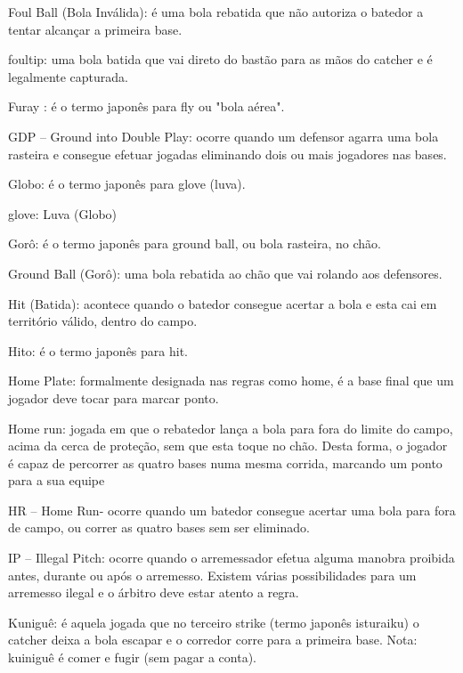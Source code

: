 Foul Ball (Bola Inválida): é uma bola rebatida que não autoriza o batedor a tentar alcançar a primeira base.

\gls{foultip}: uma bola batida que vai direto do bastão para as mãos do catcher e é legalmente capturada.

Furay : é o termo japonês para \gls{fly} ou "bola aérea".

GDP -- Ground into Double Play: ocorre quando um defensor agarra uma bola rasteira e consegue efetuar jogadas eliminando dois ou mais jogadores nas bases.

Globo: é o termo japonês para \gls{glove} (luva).

glove: Luva (Globo)

Gorô: é o termo japonês para \gls{ground} ball, ou bola rasteira, no chão.

Ground Ball (Gorô): uma bola rebatida ao chão que vai rolando aos defensores.



Hit (Batida): acontece quando o batedor consegue acertar a bola e esta cai em território válido, dentro do campo.

Hito: é o termo japonês para \gls{hit}.

Home Plate: formalmente designada nas regras como \gls{home}, é a base final que um jogador deve tocar para marcar ponto.

Home run: jogada em que o rebatedor lança a bola para fora do limite do campo, acima da cerca de proteção, sem que esta toque no chão. Desta forma, o jogador é capaz de percorrer as quatro bases numa mesma corrida, marcando um ponto para a sua equipe

HR -- Home Run- ocorre quando um batedor consegue acertar uma bola para fora de campo, ou correr as quatro bases sem ser eliminado.

IP -- Illegal Pitch: ocorre quando o arremessador efetua alguma manobra proibida antes, durante ou após o arremesso. Existem várias possibilidades para um arremesso ilegal e o árbitro deve estar atento a regra.


Kuniguê: é aquela jogada que no terceiro strike (termo japonês isturaiku) o catcher deixa a bola escapar e o corredor corre para a primeira base. Nota: kuiniguê é comer e fugir (sem pagar a conta).

